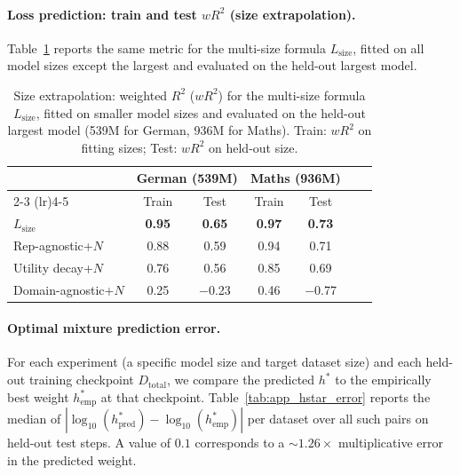 \paragraph{Loss prediction: train and test $wR^2$ (size extrapolation).}
Table~\ref{tab:app_scaling_r2_size_full} reports the same metric for the multi-size formula $L_\mathrm{size}$, fitted on all model sizes except the largest and evaluated on the held-out largest model.

\begin{table}[h]
\centering
\caption{Size extrapolation: weighted $R^2$ ($wR^2$) for the multi-size formula $L_\mathrm{size}$, fitted on smaller model sizes and evaluated on the held-out largest model (539M for German, 936M for Maths). Train: $wR^2$ on fitting sizes; Test: $wR^2$ on held-out size.}
\label{tab:app_scaling_r2_size_full}
\small
\begin{tabular}{lcccccc}
\toprule
& \multicolumn{2}{c}{German (539M)} & \multicolumn{2}{c}{Maths (936M)} \\
\cmidrule(lr){2-3} \cmidrule(lr){4-5}
& Train & Test & Train & Test \\
\midrule
$L_\mathrm{size}$ & \textbf{0.95} & \textbf{0.65} & \textbf{0.97} & \textbf{0.73} \\
Rep-agnostic+$N$ & 0.88 & 0.59 & 0.94 & 0.71 \\
Utility decay+$N$ & 0.76 & 0.56 & 0.85 & 0.69 \\
Domain-agnostic+$N$ & 0.25 & $-$0.23 & 0.46 & $-$0.77 \\
\bottomrule
\end{tabular}
\end{table}

\paragraph{Optimal mixture prediction error.}
For each experiment (a specific model size and target dataset size) and each held-out training checkpoint $D_\text{total}$, we compare the predicted $h^*$ to the empirically best weight $h^*_\text{emp}$ at that checkpoint. Table~\ref{tab:app_hstar_error} reports the median of $|\log_{10}(h^*_\text{pred}) - \log_{10}(h^*_\text{emp})|$ per dataset over all such pairs on held-out test steps. A value of $0.1$ corresponds to a ${\sim}1.26\times$ multiplicative error in the predicted weight.

